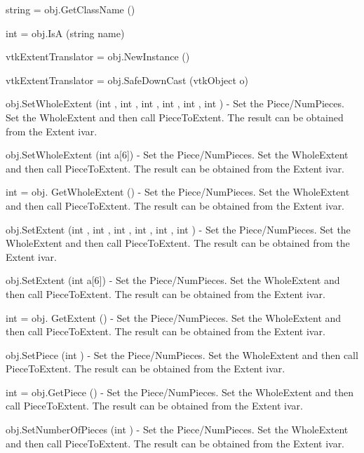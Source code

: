 \begin{DoxyItemize}
\item {\ttfamily string = obj.\-Get\-Class\-Name ()}  
\item {\ttfamily int = obj.\-Is\-A (string name)}  
\item {\ttfamily vtk\-Extent\-Translator = obj.\-New\-Instance ()}  
\item {\ttfamily vtk\-Extent\-Translator = obj.\-Safe\-Down\-Cast (vtk\-Object o)}  
\item {\ttfamily obj.\-Set\-Whole\-Extent (int , int , int , int , int , int )} -\/ Set the Piece/\-Num\-Pieces. Set the Whole\-Extent and then call Piece\-To\-Extent. The result can be obtained from the Extent ivar.  
\item {\ttfamily obj.\-Set\-Whole\-Extent (int a\mbox{[}6\mbox{]})} -\/ Set the Piece/\-Num\-Pieces. Set the Whole\-Extent and then call Piece\-To\-Extent. The result can be obtained from the Extent ivar.  
\item {\ttfamily int = obj. Get\-Whole\-Extent ()} -\/ Set the Piece/\-Num\-Pieces. Set the Whole\-Extent and then call Piece\-To\-Extent. The result can be obtained from the Extent ivar.  
\item {\ttfamily obj.\-Set\-Extent (int , int , int , int , int , int )} -\/ Set the Piece/\-Num\-Pieces. Set the Whole\-Extent and then call Piece\-To\-Extent. The result can be obtained from the Extent ivar.  
\item {\ttfamily obj.\-Set\-Extent (int a\mbox{[}6\mbox{]})} -\/ Set the Piece/\-Num\-Pieces. Set the Whole\-Extent and then call Piece\-To\-Extent. The result can be obtained from the Extent ivar.  
\item {\ttfamily int = obj. Get\-Extent ()} -\/ Set the Piece/\-Num\-Pieces. Set the Whole\-Extent and then call Piece\-To\-Extent. The result can be obtained from the Extent ivar.  
\item {\ttfamily obj.\-Set\-Piece (int )} -\/ Set the Piece/\-Num\-Pieces. Set the Whole\-Extent and then call Piece\-To\-Extent. The result can be obtained from the Extent ivar.  
\item {\ttfamily int = obj.\-Get\-Piece ()} -\/ Set the Piece/\-Num\-Pieces. Set the Whole\-Extent and then call Piece\-To\-Extent. The result can be obtained from the Extent ivar.  
\item {\ttfamily obj.\-Set\-Number\-Of\-Pieces (int )} -\/ Set the Piece/\-Num\-Pieces. Set the Whole\-Extent and then call Piece\-To\-Extent. The result can be obtained from the Extent ivar.  

\end{DoxyItemize}

